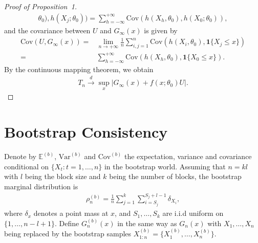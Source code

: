 \documentclass[12pt]{article}
\begin{document}
\begin{proof}[Proof of Proposition~1]
\begin{align*}
\theta_0),h(X_j;\theta_0))
= \sum^{+\infty}_{h=-\infty}\text{Cov}(h(X_{h},\theta_0),h(X_0;\theta_0)),
\end{align*}
and the covariance between $U$ and $G_{\infty}(x)$ is given by
\begin{align*}
\text{Cov}(U,G_\infty(x))=&\lim_{n\rightarrow+\infty}
\frac{1}{n}\sum^{n}_{i,j=1}\text{Cov}(h(X_i,\theta_0),\mathbf{1}\{X_j\leq x\})
\\=&\sum^{+\infty}_{h=-\infty}
\text{Cov}(h(X_{h},\theta_0),\mathbf{1}\{X_0\leq x\}).
\end{align*}
By the continuous mapping theorem, we obtain
\begin{align*}
T_n \overset{d}{\rightarrow} \sup_x |G_{\infty}(x)+f(x;\theta_0)U|.    
\end{align*}

\end{proof}

\section{Bootstrap Consistency}

Denote by $\mathbb{E}^{(b)}$, $\text{Var}^{(b)}$ and $\text{Cov}^{(b)}$
the expectation, variance and covariance conditional on 
$\{X_t: t = 1, \ldots, n\}$ in 
the bootstrap world. Assuming that $n=kl$ with $l$ being the block size and $k$ 
being the number of blocks, the bootstrap marginal distribution is 
\begin{align*}
\rho_n^{(b)}=\frac{1}{n}\sum^{k}_{j=1}\sum^{S_j+l-1}_{i=S_j} \delta_{X_i},    
\end{align*}
where $\delta_x$ denotes a point mass at $x$, and $S_1,\dots,S_k$ are i.i.d 
uniform on $\{1,\dots,n-l+1\}$. 
Define $G_n^{(b)}(x)$ in the same way as $G_n(x)$ with $X_1, \dots, X_n$ being 
replaced by the bootstrap samples $X_{1:n}^{(b)}=\{X_1^{(b)},\dots,X_n^{(b)}\}$.
\end{document}
